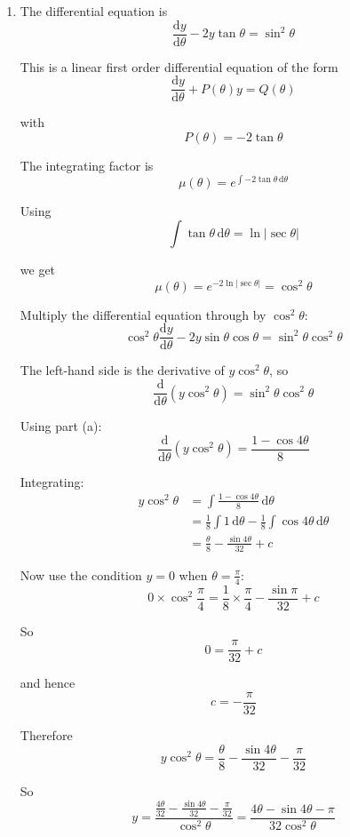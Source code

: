 \documentclass[leqno]{article}
\begin{document}
\begin{enumerate}[
  label=\textbf{\arabic*.},
  leftmargin=*,
  topsep=0pt,
  partopsep=0pt,
  parsep=0pt
]
\begin{djsSolution}
\begin{enumerate}[label=\textbf{(\alph*)}]
Hence
\[
\cos4\theta=1-8\sin^2\theta\cos^2\theta
\]

Therefore
\[
\sin^2\theta\cos^2\theta=\frac{1-\cos4\theta}{8}
\]

So
\[
\sin^2\theta\cos^2\theta=\frac{1}{8}(1-\cos4\theta)
\]

  \item The differential equation is
\[
\frac{\mathrm{d}y}{\mathrm{d}\theta}-2y\tan\theta=\sin^2\theta
\]

This is a linear first order differential equation of the form
\[
\frac{\mathrm{d}y}{\mathrm{d}\theta}+P(\theta)y=Q(\theta)
\]

with
\[
P(\theta)=-2\tan\theta
\]

The integrating factor is
\[
\mu(\theta)=e^{\int -2\tan\theta\,\mathrm{d}\theta}
\]

Using
\[
\int \tan\theta\,\mathrm{d}\theta=\ln|\sec\theta|
\]

we get
\[
\mu(\theta)=e^{-2\ln|\sec\theta|}=\cos^2\theta
\]

Multiply the differential equation through by \(\cos^2\theta\):
\[
\cos^2\theta\frac{\mathrm{d}y}{\mathrm{d}\theta}-2y\sin\theta\cos\theta=\sin^2\theta\cos^2\theta
\]

The left-hand side is the derivative of \(y\cos^2\theta\), so
\[
\frac{\mathrm{d}}{\mathrm{d}\theta}(y\cos^2\theta)=\sin^2\theta\cos^2\theta
\]

Using part (a):
\[
\frac{\mathrm{d}}{\mathrm{d}\theta}(y\cos^2\theta)=\frac{1-\cos4\theta}{8}
\]

Integrating:
\begin{align*}
y\cos^2\theta
&=\int \frac{1-\cos4\theta}{8}\,\mathrm{d}\theta \\
&=\frac{1}{8}\int 1\,\mathrm{d}\theta-\frac{1}{8}\int \cos4\theta\,\mathrm{d}\theta \\
&=\frac{\theta}{8}-\frac{\sin4\theta}{32}+c
\end{align*}

Now use the condition \(y=0\) when \(\theta=\frac{\pi}{4}\):
\[
0\times\cos^2\frac{\pi}{4}=\frac{1}{8}\times\frac{\pi}{4}-\frac{\sin\pi}{32}+c
\]

So
\[
0=\frac{\pi}{32}+c
\]

and hence
\[
c=-\frac{\pi}{32}
\]

Therefore
\[
y\cos^2\theta=\frac{\theta}{8}-\frac{\sin4\theta}{32}-\frac{\pi}{32}
\]

So
\[
y=\frac{\frac{4\theta}{32}-\frac{\sin4\theta}{32}-\frac{\pi}{32}}{\cos^2\theta}
=\frac{4\theta-\sin4\theta-\pi}{32\cos^2\theta}
\]
  \end{enumerate}
\end{djsSolution}



\end{enumerate}
\end{document}

